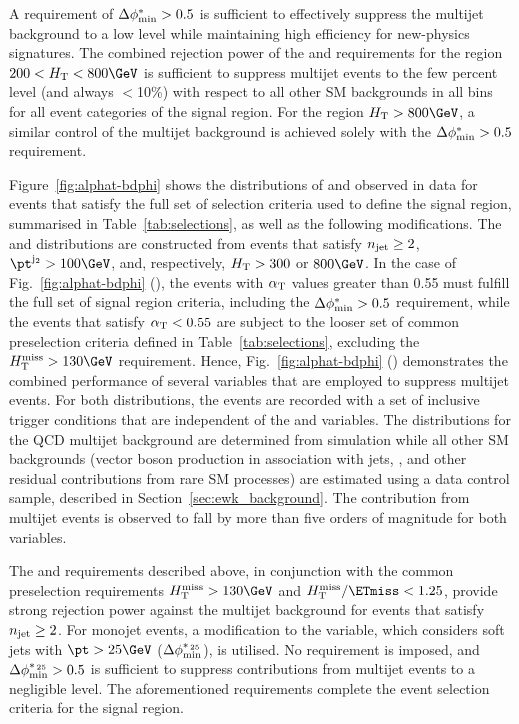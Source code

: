 A requirement of $\Delta\phi^{*}_\text{min} > 0.5$ is sufficient to effectively suppress
the multijet background to a low level while maintaining high
efficiency for new-physics signatures. The combined rejection power of
the \alphat and \bdphi requirements for the region $200 < \scalht <
800\GeV$ is sufficient to suppress multijet events to the few percent
level (and always $<$10\%) with respect to all other SM backgrounds in
all \scalht bins for all event categories of the signal region. For
the region $\scalht > 800\GeV$, a similar control of the multijet
background is achieved solely with the $\Delta\phi^{*}_\text{min} > 0.5$ requirement.

Figure~\ref{fig:alphat-bdphi} shows the distributions of \alphat and
\bdphi observed in data for events that satisfy the full set of
selection criteria used to define the signal region, summarised in
Table~\ref{tab:selections}, as well as the following
modifications. The \alphat and \bdphi distributions are constructed
from events that satisfy $n_{\text{jet}} \geq 2$, $\pt^{\mathrm{j_2}} >
100\GeV$, and, respectively, $H_{\mathrm{T}} > 300$ or $800\GeV$. In the case
of Fig.~\ref{fig:alphat-bdphi} (\cmsLeft), the events with $\alpha_{\mathrm{T}}$
values greater than 0.55 must fulfill the full set of signal region
criteria, including the $\Delta\phi^{*}_\text{min} > 0.5$ requirement, while the events
that satisfy $\alpha_{\mathrm{T}} < 0.55$ are subject to the looser set of common
preselection criteria defined in Table~\ref{tab:selections},
excluding the $\HTmiss > 130\GeV$ requirement. Hence,
Fig.~\ref{fig:alphat-bdphi} (\cmsLeft) demonstrates the combined
performance of several variables that are employed to suppress
multijet events. For both distributions, the events are recorded with
a set of inclusive trigger conditions that are independent of the
\alphat and \bdphi variables. The distributions for the QCD multijet
background are determined from simulation while all other SM
backgrounds (vector boson production in association with jets, \ttbar,
and other residual contributions from rare SM processes) are estimated
using a \mj data control sample, described in
Section~\ref{sec:ewk_background}. The contribution from multijet
events is observed to fall by more than five orders of magnitude for
both variables.

The \alphat and \bdphi requirements described above, in conjunction
with the common preselection requirements $\HTmiss > 130\GeV$ and
$\HTmiss / \ETmiss < 1.25$, provide strong rejection power against the
multijet background for events that satisfy $n_{\text{jet}} \geq 2$. For
monojet events, a modification to the \bdphi variable, which considers
soft jets with $\pt > 25\GeV$ ($\Delta\phi^{*_{\, 25}}_\text{min}$), is utilised. No \alphat
requirement is imposed, and $\Delta\phi^{*_{\, 25}}_\text{min} > 0.5$ is sufficient to
suppress contributions from multijet events to a negligible level.
The aforementioned requirements complete the event selection criteria
for the signal region.

